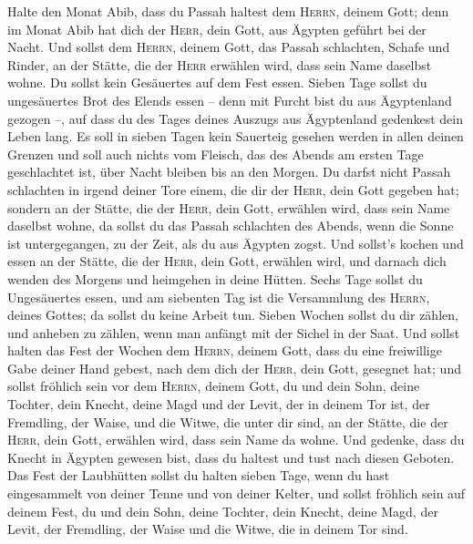  Halte den Monat Abib, dass du Passah haltest dem
\textsc{Herrn}, deinem Gott; denn im Monat Abib hat dich der
\textsc{Herr}, dein Gott, aus Ägypten geführt bei der Nacht.
 Und sollst dem \textsc{Herrn}, deinem Gott, das Passah
schlachten, Schafe und Rinder, an der Stätte, die der \textsc{Herr}
erwählen wird, dass sein Name daselbst wohne.  Du sollst
kein Gesäuertes auf dem Fest essen. Sieben Tage sollst du ungesäuertes
Brot des Elends essen -- denn mit Furcht bist du aus Ägyptenland gezogen
--, auf dass du des Tages deines Auszugs aus Ägyptenland gedenkest dein
Leben lang.  Es soll in sieben Tagen kein Sauerteig
gesehen werden in allen deinen Grenzen und soll auch nichts vom Fleisch,
das des Abends am ersten Tage geschlachtet ist, über Nacht bleiben bis
an den Morgen.  Du darfst nicht Passah schlachten in
irgend deiner Tore einem, die dir der \textsc{Herr}, dein Gott gegeben
hat;  sondern an der Stätte, die der \textsc{Herr}, dein
Gott, erwählen wird, dass sein Name daselbst wohne, da sollst du das
Passah schlachten des Abends, wenn die Sonne ist untergegangen, zu der
Zeit, als du aus Ägypten zogst.  Und sollst's kochen und
essen an der Stätte, die der \textsc{Herr}, dein Gott, erwählen wird,
und darnach dich wenden des Morgens und heimgehen in deine Hütten.
 Sechs Tage sollst du Ungesäuertes essen, und am siebenten
Tag ist die Versammlung des \textsc{Herrn}, deines Gottes; da sollst du
keine Arbeit tun.  Sieben Wochen sollst du dir zählen, und
anheben zu zählen, wenn man anfängt mit der Sichel in der Saat.
 Und sollst halten das Fest der Wochen dem
\textsc{Herrn}, deinem Gott, dass du eine freiwillige Gabe deiner Hand
gebest, nach dem dich der \textsc{Herr}, dein Gott, gesegnet hat;
 und sollst fröhlich sein vor dem \textsc{Herrn}, deinem
Gott, du und dein Sohn, deine Tochter, dein Knecht, deine Magd und der
Levit, der in deinem Tor ist, der Fremdling, der Waise, und die Witwe,
die unter dir sind, an der Stätte, die der \textsc{Herr}, dein Gott,
erwählen wird, dass sein Name da wohne.  Und gedenke,
dass du Knecht in Ägypten gewesen bist, dass du haltest und tust nach
diesen Geboten.  Das Fest der Laubhütten sollst du halten
sieben Tage, wenn du hast eingesammelt von deiner Tenne und von deiner
Kelter,  und sollst fröhlich sein auf deinem Fest, du und
dein Sohn, deine Tochter, dein Knecht, deine Magd, der Levit, der
Fremdling, der Waise und die Witwe, die in deinem Tor sind.
